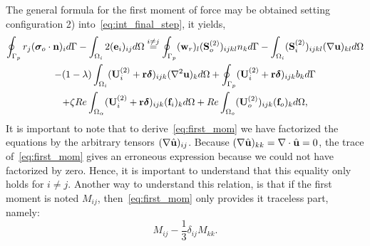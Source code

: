 The general formula for the first moment of force may be obtained setting configuration 2) into~\ref{eq:int_final_step}, it yields,
\begin{multline}
    \intS[p]{r_j(\bm\sigma_{o}\cdot \textbf{n})_i}
    - \intO[i]{2(\textbf{e}_i)_{ij}}
    \overset{i\neq j}{=}
    \intS[p]{(\textbf{w}_{r})_l (\textbf{S}^{(2)}_{o})_{ijkl} n_k}
    - \intO[i]{(\textbf{S}^{(2)}_{i})_{ijkl}(\grad\textbf{u})_{kl}}\\
    - (1-\lambda) \intO[i]{(\textbf{U}_{i}^{(2)} + \textbf{r}\bm\delta)_{ijk} (\grad^2 \textbf{u})_k }
    + \intS[p]{(\textbf{U}_{i}^{(2)} + \textbf{r}\bm\delta)_{ijk} b_k}\\
    + \zeta Re \intO{(\textbf{U}_{i}^{(2)} + \textbf{r}\bm\delta)_{ijk} (\textbf{f}_{i})_k} 
    + Re\intO[o]{(\textbf{U}_{o}^{(2)})_{ijk}(\textbf{f}_{o})_k},
    \label{eq:first_mom}
\end{multline}
It is important to note that to derive~\ref{eq:first_mom} we have factorized the equations by the arbitrary tensors $(\mathbf{\nabla} \hat{\textbf{u}})_{ij}$. 
Because $(\mathbf{\nabla} \hat{\textbf{u}})_{kk}=\mathbf{\nabla}\cdot \hat{\textbf{u}} = 0$, the trace of~\ref{eq:first_mom} gives an erroneous expression because we could not have factorized by zero.  
Hence, it is important to understand that this equality only holds for $i\neq j$. 
Another way to understand this relation, is that if the first moment is noted $M_{ij}$, then~\ref{eq:first_mom} only provides it traceless part, namely:
\begin{equation}
    M_{ij} - \frac{1}{3}\delta_{ij}M_{kk}.
\end{equation}


